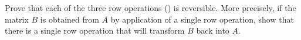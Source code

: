 Prove that each of the three row operations () is reversible.  More precisely, if the matrix $B$ is obtained from $A$ by application of a single row operation, show that there is a single row operation that will transform $B$ back into $A$.